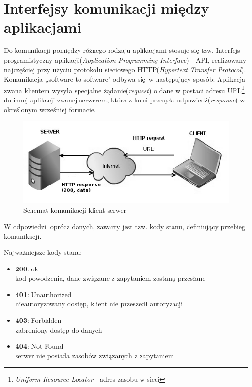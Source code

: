 \section{Interfejsy komunikacji między aplikacjami}
Do komunikacji pomiędzy różnego rodzaju aplikacjami stosuje się tzw. Interfejs programistyczny aplikacji(\emph{Application Programming Interface}) - API, realizowany najczęściej przy użyciu protokołu sieciowego HTTP(\emph{Hypertext Transfer Protocol}).
Komunikacja ,,software-to-software" odbywa się w następujący sposób:
Aplikacja zwana klientem wysyła specjalne żądanie(\emph{request}) o dane w postaci adresu URL\footnote{\emph{Uniform Resource Locator} - adres zasobu w sieci} do innej aplikacji zwanej serwerem, która z kolei przesyła odpowiedź(\emph{response}) w określonym wcześniej formacie.

\begin{figure}[h]
  \centering
  \includegraphics[scale=0.87]{images/http_communication.png}
  \caption{Schemat komunikacji klient-serwer}
\end{figure}

W odpowiedzi, oprócz danych, zawarty jest tzw. kody stanu, definiujący przebieg komunikacji.

Najważniejsze kody stanu:
 \begin{itemize}
     \item \textbf {200}: ok \\
     kod powodzenia, dane związane z zapytaniem zostaną przesłane
     \item \textbf {401}: Unauthorized \\
     nieautoryzowany dostęp, klient nie przeszedł autoryzacji
     \item \textbf {403}: Forbidden \\
     zabroniony dostęp do danych
     \item \textbf {404}: Not Found \\
     serwer nie posiada zasobów związanych z zapytaniem
  \end{itemize}

